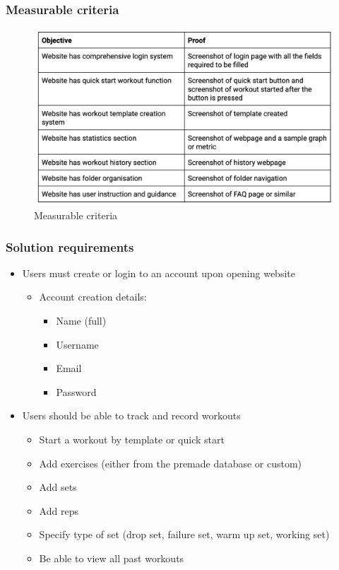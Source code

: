 \documentclass{article}
\begin{document}
\subsubsection{Measurable criteria}

\begin{figure}
  \centering
  \includegraphics[width=1\textwidth]{Figure 10.png}
  \caption{Measurable criteria}
\end{figure}

\newpage

\subsubsection{Solution requirements}

\begin{itemize}
  \item Users must create or login to an account upon opening website
  \begin{itemize}
    \item Account creation details:
    \begin{itemize}
      \item Name (full)
      \item Username
      \item Email
      \item Password
    \end{itemize}
  \end{itemize}
  \item Users should be able to track and record workouts
  \begin{itemize}
    \item Start a workout by template or quick start
    \item Add exercises (either from the premade database or custom)
    \item Add sets
    \item Add reps 
    \item Specify type of set (drop set, failure set, warm up set, working set)
    \item Be able to view all past workouts
  \end{itemize}
\end{itemize}
\end{document}
